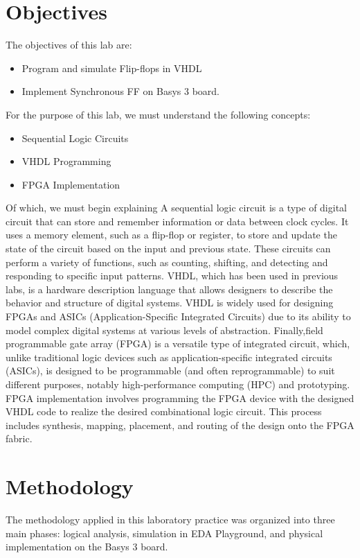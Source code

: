 \documentclass[12pt]{article}  %
\begin{document}
\section{Objectives} %
The objectives of this lab are:
\begin{itemize}
    \item Program and simulate Flip-flops in VHDL
    \item Implement Synchronous FF on Basys 3 board.
\end{itemize}
For the purpose of this lab, we must understand the following concepts:
\begin{itemize}
    \item Sequential Logic Circuits
    \item VHDL Programming
    \item FPGA Implementation
\end{itemize}
Of which, we must begin explaining A sequential logic circuit is a type of digital circuit that can store and remember information or data between clock cycles. It uses a memory element, such as a flip-flop or register, to store and update the state of the circuit based on the input and previous state. These circuits can perform a variety of functions, such as counting, shifting, and detecting and responding to specific input patterns. \cite{ChipVerifySequentialLogic}
VHDL, which has been used in previous labs, is a hardware description language that allows designers to describe the behavior and structure of digital systems. VHDL is widely used for designing FPGAs and ASICs (Application-Specific Integrated Circuits) due to its ability to model complex digital systems at various levels of abstraction.\cite{IntelVHDLDef}
Finally,field programmable gate array (FPGA) is a versatile type of integrated circuit, which, unlike traditional logic devices such as application-specific integrated circuits (ASICs), is designed to be programmable (and often reprogrammable) to suit different purposes, notably high-performance computing (HPC) and prototyping.\cite{IBMFPGA} FPGA implementation involves programming the FPGA device with the designed VHDL code to realize the desired combinational logic circuit. This process includes synthesis, mapping, placement, and routing of the design onto the FPGA fabric. 

\section{Methodology}
The methodology applied in this laboratory practice was organized into three main phases: logical analysis, simulation in EDA Playground, and physical implementation on the Basys 3 board.
\end{document}
